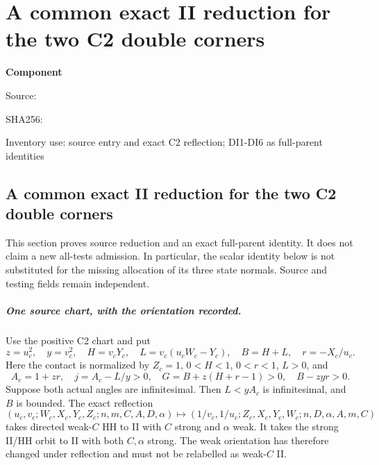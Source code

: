 \chapter{A common exact II reduction for the two C2 double corners}
\label{component:pfb3a83f3849a}
\noindent\textbf{Component }\par
{\small\noindent Source: \par}
{\small\noindent SHA256: \par}
{\small\noindent Inventory use: source entry and exact C2 reflection; DI1-DI6 as full-parent identities\par}
\medskip
\section{A common exact II reduction for the two C2 double corners}
\label{pfb3a83f3849a:sec:r6-c2-double}

This section proves source reduction and an exact full-parent identity.
It does not claim a new all-tests admission.  In particular, the scalar
identity below is not substituted for the missing allocation of its
three state normals.  Source and testing fields remain independent.

\paragraph{One source chart, with the orientation recorded.}
Use the positive C2 chart and put
\[
 z=u_c^2,\quad y=v_c^2,\quad H=v_cY_c,\quad
 L=v_c(u_cW_c-Y_c),\quad B=H+L,\quad r=-X_c/u_c.
\]
Here the contact is normalized by $Z_c=1$, $0<H<1$, $0<r<1$,
$L>0$, and
\[
 A_c=1+zr,\quad j=A_c-L/y>0,\quad
 G=B+z(H+r-1)>0,\quad B-zyr>0.
\]
Suppose both actual angles are infinitesimal.  Then $L<yA_c$ is
infinitesimal, and $B$ is bounded.  The exact reflection
\[
 (u_c,v_c;W_c,X_c,Y_c,Z_c;n,m,C,A,D,\alpha)
 \mapsto(1/v_c,1/u_c;Z_c,X_c,Y_c,W_c;n,D,\alpha,A,m,C)
\]
takes directed weak-$C$ HH to II with $C$ strong and $\alpha$ weak.
It takes the strong II/HH orbit to II with both $C,\alpha$ strong.
The weak orientation has therefore changed under reflection and must
not be relabelled as weak-$C$ II.


